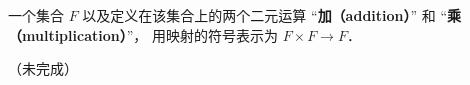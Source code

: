 

一个集合 $F$ 以及定义在该集合上的两个二元运算 “\textbf{加（addition）}” 和 “\textbf{乘（multiplication）}”， 用映射的符号表示为 $F\times F \to F$．

（未完成）
